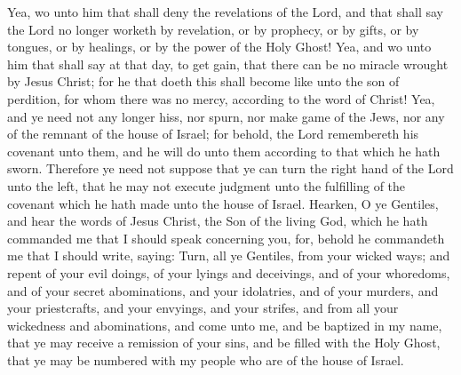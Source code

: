 Yea, wo unto him that shall deny the revelations of the Lord, and that shall say the Lord no longer worketh by revelation, or by prophecy, or by gifts, or by tongues, or by healings, or by the power of the Holy Ghost!
\bverse \iffalse Yea, and wo unto him that shall say at that day, to get gain, that there can be no miracle wrought by Jesus Christ; for he that doeth this shall become like unto the son of perdition, for whom there was no mercy, according to the word of Christ! \fi
Yea, and wo unto him that shall say at that day, to get gain, that there can be no miracle wrought by Jesus Christ; for he that doeth this shall become like unto the son of perdition, for whom there was no mercy, according to the word of Christ!
\bverse \iffalse Yea, and ye need not any longer hiss, nor spurn, nor make game of the Jews, nor any of the remnant of the house of Israel; for behold, the Lord remembereth his covenant unto them, and he will do unto them according to that which he hath sworn. \fi
Yea, and ye need not any longer hiss, nor spurn, nor make game of the Jews, nor any of the remnant of the house of Israel; for behold, the Lord remembereth his covenant unto them, and he will do unto them according to that which he hath sworn.
\bverse \iffalse Therefore ye need not suppose that ye can turn the right hand of the Lord unto the left, that he may not execute judgment unto the fulfilling of the covenant which he hath made unto the house of Israel. \fi
Therefore ye need not suppose that ye can turn the right hand of the Lord unto the left, that he may not execute judgment unto the fulfilling of the covenant which he hath made unto the house of Israel.
\bchapter
\bverse \iffalse Hearken, O ye Gentiles, and hear the words of Jesus Christ, the Son of the living God, which he hath commanded me that I should speak concerning you, for, behold he commandeth me that I should write, saying: \fi
Hearken, O ye Gentiles, and hear the words of Jesus Christ, the Son of the living God, which he hath commanded me that I should speak concerning you, for, behold he commandeth me that I should write, saying:
\bverse \iffalse Turn, all ye Gentiles, from your wicked ways; and repent of your evil doings, of your lyings and deceivings, and of your whoredoms, and of your secret abominations, and your idolatries, and of your murders, and your priestcrafts, and your envyings, and your strifes, and from all your wickedness and abominations, and come unto me, and be baptized in my name, that ye may receive a remission of your sins, and be filled with the Holy Ghost, that ye may be numbered with my people who are of the house of Israel. \fi
Turn, all ye Gentiles, from your wicked ways; and repent of your evil doings, of your lyings and deceivings, and of your whoredoms, and of your secret abominations, and your idolatries, and of your murders, and your priestcrafts, and your envyings, and your strifes, and from all your wickedness and abominations, and come unto me, and be baptized in my name, that ye may receive a remission of your sins, and be filled with the Holy Ghost, that ye may be numbered with my people who are of the house of Israel.
